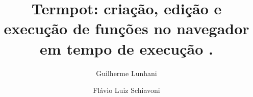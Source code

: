 \title{Termpot: criação, edição e execução de funções no navegador em tempo de execução .}

\author{Guilherme Lunhani
        \and 
        Flávio Luiz Schiavoni}

\address{Instituto de Artes e Design --
         Universidade Federal de Juiz de Fora \\
         Juiz de Fora, MG
         \nextinstitute
         Departamento de Computação --
         Universidade Federal de São João Del Rei \\
         São João Del Rei, MG
}